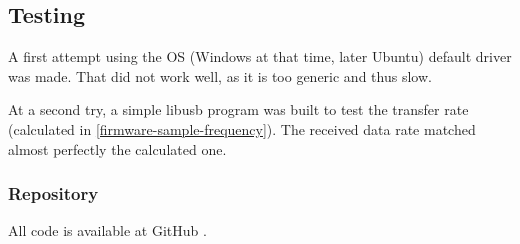 \subsection{Testing}
A first attempt using the OS (Windows at that time, later Ubuntu) default driver
was made. That did not work well, as it is too generic and thus slow. 

At a second try, a simple libusb \cite{libusb} program was built to test the transfer
rate (calculated in \autoref{firmware-sample-frequency}). The received data rate matched
almost perfectly the calculated one.

\subsubsection{Repository}
All code is available at GitHub \cite{guitar-digitizer-firmware}.
